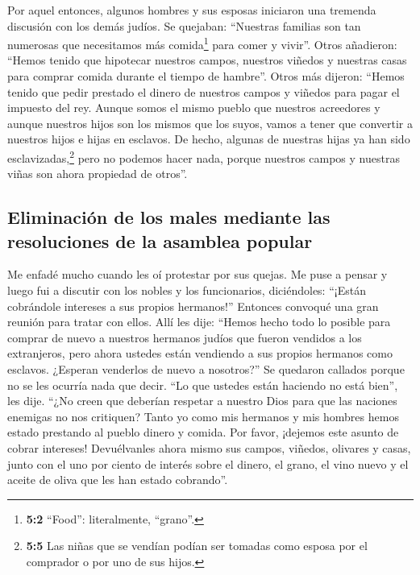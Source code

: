  Por aquel entonces, algunos hombres y sus esposas
iniciaron una tremenda discusión con los demás judíos.  Se
quejaban: ``Nuestras familias son tan numerosas que necesitamos más
comida\footnote{\textbf{5:2} ``Food'': literalmente, ``grano''.} para
comer y vivir''.  Otros añadieron: ``Hemos tenido que
hipotecar nuestros campos, nuestros viñedos y nuestras casas para
comprar comida durante el tiempo de hambre''.  Otros más
dijeron: ``Hemos tenido que pedir prestado el dinero de nuestros campos
y viñedos para pagar el impuesto del rey.  Aunque somos el
mismo pueblo que nuestros acreedores y aunque nuestros hijos son los
mismos que los suyos, vamos a tener que convertir a nuestros hijos e
hijas en esclavos. De hecho, algunas de nuestras hijas ya han sido
esclavizadas,\footnote{\textbf{5:5} Las niñas que se vendían podían ser
  tomadas como esposa por el comprador o por uno de sus hijos.} pero no
podemos hacer nada, porque nuestros campos y nuestras viñas son ahora
propiedad de otros''.

\hypertarget{eliminaciuxf3n-de-los-males-mediante-las-resoluciones-de-la-asamblea-popular}{%
\subsection{Eliminación de los males mediante las resoluciones de la
asamblea
popular}\label{eliminaciuxf3n-de-los-males-mediante-las-resoluciones-de-la-asamblea-popular}}

 Me enfadé mucho cuando les oí protestar por sus quejas.
 Me puse a pensar y luego fui a discutir con los nobles y
los funcionarios, diciéndoles: ``¡Están cobrándole intereses a sus
propios hermanos!'' Entonces convoqué una gran reunión para tratar con
ellos.  Allí les dije: ``Hemos hecho todo lo posible para
comprar de nuevo a nuestros hermanos judíos que fueron vendidos a los
extranjeros, pero ahora ustedes están vendiendo a sus propios hermanos
como esclavos. ¿Esperan venderlos de nuevo a nosotros?'' Se quedaron
callados porque no se les ocurría nada que decir.  ``Lo
que ustedes están haciendo no está bien'', les dije. ``¿No creen que
deberían respetar a nuestro Dios para que las naciones enemigas no nos
critiquen?  Tanto yo como mis hermanos y mis hombres
hemos estado prestando al pueblo dinero y comida. Por favor, ¡dejemos
este asunto de cobrar intereses!  Devuélvanles ahora
mismo sus campos, viñedos, olivares y casas, junto con el uno por ciento
de interés sobre el dinero, el grano, el vino nuevo y el aceite de oliva
que les han estado cobrando''.

